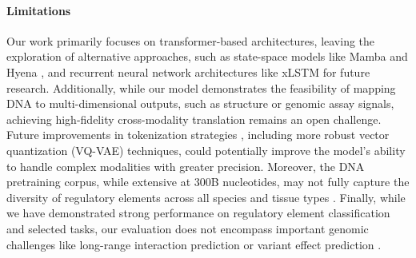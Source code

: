 \paragraph{Limitations} Our work primarily focuses on transformer-based architectures, leaving the exploration of alternative approaches, such as state-space models like Mamba \cite{gu2023mamba} and Hyena \cite{nguyen2024hyenadna}, and recurrent neural network architectures like xLSTM \cite{schmidinger2024bio} for future research. Additionally, while our model demonstrates the feasibility of mapping DNA to multi-dimensional outputs, such as structure or genomic assay signals, achieving high-fidelity cross-modality translation remains an open challenge. Future improvements in tokenization strategies \cite{li2024vqdna, pagnoni2024byte, qiao2024model}, including more robust vector quantization (VQ-VAE) techniques, could potentially improve the model’s ability to handle complex modalities with greater precision. Moreover, the DNA pretraining corpus, while extensive at 300B nucleotides, may not fully capture the diversity of regulatory elements across all species and tissue types \cite{andrews2023mammalian}. Finally, while we have demonstrated strong performance on regulatory element classification and selected tasks, our evaluation does not encompass important genomic challenges like long-range interaction prediction \cite{cheng2025dnalongbench} or variant effect prediction \cite{li2024gv}.
